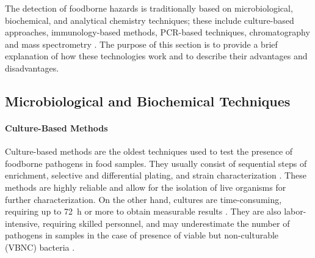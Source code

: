 The detection of foodborne hazards is traditionally based on microbiological,
biochemical, and analytical chemistry techniques; these include culture-based
approaches, immunology-based methods, PCR-based techniques, chromatography and
mass spectrometry \citep{velusamyOverview2010,iammarinoAdvanced2022}. The
purpose of this section is to provide a brief explanation of how these
technologies work and to describe their advantages and disadvantages.

\subsection{Microbiological and Biochemical Techniques}
\label{sec:microbiological_detection}

\paragraph{Culture-Based Methods}
Culture-based methods are the oldest techniques used to test the presence of
foodborne pathogens in food samples. They usually consist of sequential steps of
enrichment, selective and differential plating, and strain characterization
\citep{kabirazConventional2023}. These methods are highly reliable and allow for
the isolation of live organisms for further characterization. On the other hand,
cultures are time-consuming, requiring up to \SI{72}{\hour} or more to obtain
measurable results \citep{saravananMethods2021}. They are also labor-intensive,
requiring skilled personnel, and may underestimate the number of pathogens in
samples in the case of presence of viable but non-culturable (VBNC) bacteria
\citep{liImportance2014}.

